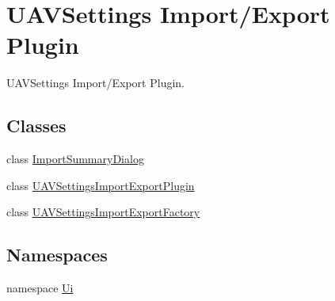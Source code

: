 \hypertarget{group___u_a_v_settings_import_export}{\section{\-U\-A\-V\-Settings \-Import/\-Export \-Plugin}
\label{group___u_a_v_settings_import_export}
}


\-U\-A\-V\-Settings \-Import/\-Export \-Plugin.  


\subsection*{\-Classes}
\begin{DoxyCompactItemize}
\item 
class \hyperlink{class_import_summary_dialog}{\-Import\-Summary\-Dialog}
\item 
class \hyperlink{class_u_a_v_settings_import_export_plugin}{\-U\-A\-V\-Settings\-Import\-Export\-Plugin}
\item 
class \hyperlink{class_u_a_v_settings_import_export_factory}{\-U\-A\-V\-Settings\-Import\-Export\-Factory}
\end{DoxyCompactItemize}
\subsection*{\-Namespaces}
\begin{DoxyCompactItemize}
\item 
namespace \hyperlink{namespace_ui}{\-Ui}
\end{DoxyCompactItemize}
